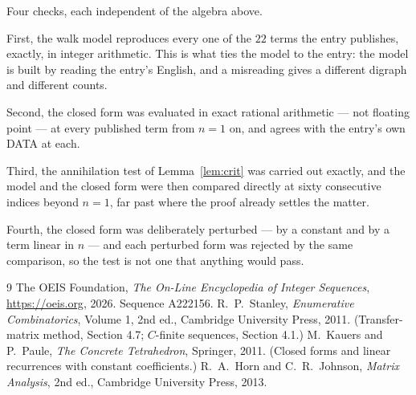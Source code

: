 \documentclass[11pt,a4paper]{article}
\theoremstyle{plain}
\theoremstyle{definition}
\begin{document}
Four checks, each independent of the algebra above.

First, the walk model reproduces every one of the $22$ terms the entry publishes,
exactly, in integer arithmetic. This is what ties the model to the entry: the model is built
by reading the entry's English, and a misreading gives a different digraph and different
counts.

Second, the closed form was evaluated in exact rational arithmetic --- not floating point ---
at every published term from $n=1$ on, and agrees with the entry's own DATA at each.

Third, the annihilation test of Lemma~\ref{lem:crit} was carried out exactly, and the model
and the closed form were then compared directly at sixty consecutive indices beyond
$n=1$, far past where the proof already settles the matter.

Fourth, the closed form was deliberately perturbed --- by a constant and by a term linear in
$n$ --- and each perturbed form was rejected by the same comparison, so the test is not one
that anything would pass.

\begin{thebibliography}{9}
 The OEIS Foundation, \emph{The On-Line Encyclopedia of Integer
Sequences}, \url{https://oeis.org}, 2026. Sequence A222156.
 R.~P.~Stanley, \emph{Enumerative Combinatorics}, Volume 1, 2nd ed.,
Cambridge University Press, 2011. (Transfer-matrix method, Section 4.7; $C$-finite sequences,
Section 4.1.)
 M.~Kauers and P.~Paule, \emph{The Concrete Tetrahedron}, Springer, 2011.
(Closed forms and linear recurrences with constant coefficients.)
 R.~A.~Horn and C.~R.~Johnson, \emph{Matrix Analysis}, 2nd ed., Cambridge
University Press, 2013.
\end{thebibliography}
\end{document}
